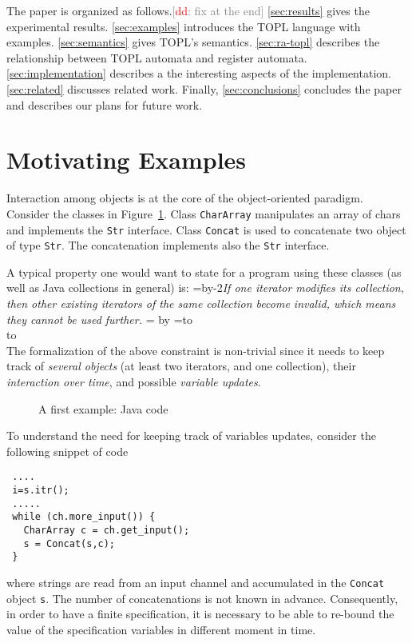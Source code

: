 \documentclass[9pt, preprint]{sigplanconf} %
\newcommand{\noterg}[2]{\textcolor{gray}{[\textcolor{red}{#1}: #2]}}
\newcommand{\dd}[1]{\noterg{dd}{#1}}
\newcommand{\dinocomment}[1]{\dd{#1}}
\newcommand{\quoteindent}{1.5\parindent} %
\newcommand{\eqquote}[2]{{%
  \refstepcounter{equation}\label{#2}%
  \newdimen\qi\qi=\quoteindent
  \setbox0=\vbox{\advance\hsize by-2\qi\noindent\em#1}%
  \newdimen\x\x=\ht0 \advance\x by\dp0%
  \setbox1=\vbox to\x{\vss\hbox{(\arabic{equation})}\vss}%
  \leavevmode\\[1ex]%
  \hbox to\hsize{\hskip\qi\box0\hfil\box1}%
  \\[1ex]}}
\theoremstyle{definition}
\theoremstyle{remark}
\begin{document}
The paper is organized as follows.\dinocomment{fix at the end}
\autoref{sec:results} gives the experimental results.
\autoref{sec:examples} introduces the TOPL language with examples.
\autoref{sec:semantics} gives TOPL's semantics.
\autoref{sec:ra-topl} describes the relationship between TOPL automata and register automata.
\autoref{sec:implementation} describes a the interesting aspects of the implementation.
\autoref{sec:related} discusses related work.
Finally, \autoref{sec:conclusions} concludes the paper and describes our plans for future work.

\section{Motivating Examples} %
Interaction among objects is at the core of the object-oriented paradigm.
Consider the classes in Figure~\ref{fig:first.java}.
Class {\tt CharArray} manipulates an array of chars and implements the {\tt Str} interface. 
Class {\tt Concat} is used to concatenate two object of type {\tt Str}. The concatenation implements also the
 {\tt Str} interface.

A typical property one would want to state for a program using these classes (as well as Java collections in general) is:
\eqquote{If one iterator modifies its collection, then other existing iterators of the same collection become invalid, which means they cannot be used further.}{q:concur-it}
The formalization of the above constraint is non-trivial since it needs to keep track of {\em several objects} (at least two iterators, and one collection), their {\em interaction over time}, and possible {\em variable updates}.
\begin{figure}[t] %
%
\begin{tiny}

\end{tiny}
\caption{A first example: Java code}
\label{fig:first.java}
\end{figure}
To understand the need for keeping track of variables updates, consider the following snippet of code
\begin{verbatim}
 ....
 i=s.itr();
 .....
 while (ch.more_input()) {
   CharArray c = ch.get_input();
   s = Concat(s,c);
 }
\end{verbatim}
where strings are read  from an input channel and accumulated in the {\tt Concat} object {\tt s}.
The number of concatenations is not known in advance. Consequently, in order to have a finite specification,
it is necessary to be able to re-bound the value of the specification variables in different moment in time.
\end{document}

